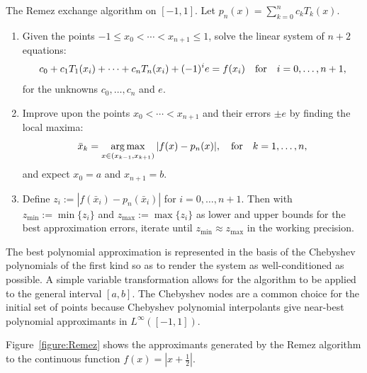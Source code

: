 \begin{algorithm}\label{algorithm:Remez} The Remez exchange algorithm on $[-1,1]$. Let $p_n(x) = \sum_{k=0}^n c_kT_k(x)$.
\begin{enumerate}
\item Given the points $-1\le x_0<\cdots<x_{n+1}\le1$, solve the linear system of $n+2$ equations:
\[ c_0 + c_1 T_1(x_i) + \cdots + c_nT_n(x_i) + (-1)^ie = f(x_i)\quad{\rm for}\quad i=0,\ldots,n+1,
\]
for the unknowns $c_0,\ldots,c_n$ and $e$.
\item Improve upon the points $x_0<\cdots<x_{n+1}$ and their errors $\pm e$ by finding the local maxima:
\[
\bar{x}_k = \argmax_{x\in(x_{k-1},x_{k+1})}|f(x)-p_n(x)|,\quad{\rm for}\quad k=1,\ldots,n,
\]
and expect $x_0=a$ and $x_{n+1}=b$.
\item Define $z_i := |f(\bar{x}_i)-p_n(\bar{x}_i)|$ for $i=0,\ldots,n+1$. Then with $z_{\min} := \min\{z_i\}$ and $z_{\max} := \max\{z_i\}$ as lower and upper bounds for the best approximation errors, iterate until $z_{\min} \approx z_{\max}$ in the working precision.
\end{enumerate}
\end{algorithm}
The best polynomial approximation is represented in the basis of the Chebyshev polynomials of the first kind so as to render the system as well-conditioned as possible. A simple variable transformation allows for the algorithm to be applied to the general interval $[a,b]$. The Chebyshev nodes are a common choice for the initial set of points because Chebyshev polynomial interpolants give near-best polynomial approximants in $L^\infty([-1,1])$.

Figure~\ref{figure:Remez} shows the approximants generated by the Remez algorithm to the continuous function $f(x) = |x+\tfrac{1}{2}|$.

